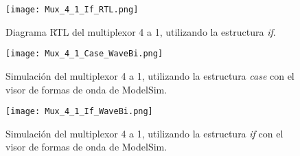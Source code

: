 \begin{figure}[ht]
	\centering
	\texttt{[image: Mux\_4\_1\_If\_RTL.png]}
	\caption{Diagrama RTL del multiplexor 4 a 1, utilizando la estructura \textit{if}. \label{fig:mux_4_1_if_rtl}}
\end{figure}

\begin{figure}[ht]
	\centering
	\texttt{[image: Mux\_4\_1\_Case\_WaveBi.png]}
	\caption{Simulación del multiplexor 4 a 1, utilizando la estructura \textit{case} con el visor de formas de onda de ModelSim. 
	\label{fig:mux_4_1_case_WaveBi}}
\end{figure}

\begin{figure}[ht]
	\centering
	\texttt{[image: Mux\_4\_1\_If\_WaveBi.png]}
	\caption{Simulación del multiplexor 4 a 1, utilizando la estructura \textit{if} con el visor de formas de onda de ModelSim. 
	\label{fig:mux_4_1_if_WaveBi}}
\end{figure}





